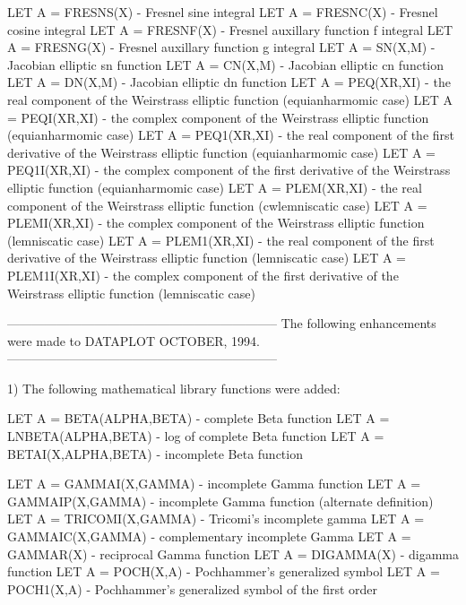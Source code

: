 {       LET A = FRESNS(X)     - Fresnel sine integral
       LET A = FRESNC(X)     - Fresnel cosine integral
       LET A = FRESNF(X)     - Fresnel auxillary function f integral
       LET A = FRESNG(X)     - Fresnel auxillary function g integral
       LET A = SN(X,M)       - Jacobian elliptic sn function
       LET A = CN(X,M)       - Jacobian elliptic cn function
       LET A = DN(X,M)       - Jacobian elliptic dn function
       LET A = PEQ(XR,XI)    - the real component of the Weirstrass
                               elliptic function (equianharmomic case)
       LET A = PEQI(XR,XI)   - the complex component of the Weirstrass
                               elliptic function (equianharmomic case)
       LET A = PEQ1(XR,XI)   - the real component of the first 
                               derivative of the Weirstrass elliptic
                               function (equianharmomic case)
       LET A = PEQ1I(XR,XI)  - the complex component of the first 
                               derivative of the Weirstrass elliptic
                               function (equianharmomic case)
       LET A = PLEM(XR,XI)   - the real component of the Weirstrass
                               elliptic function (cwlemniscatic case)
       LET A = PLEMI(XR,XI)  - the complex component of the Weirstrass
                               elliptic function (lemniscatic case)
       LET A = PLEM1(XR,XI)  - the real component of the first 
                               derivative of the Weirstrass elliptic
                               function (lemniscatic case)
       LET A = PLEM1I(XR,XI) - the complex component of the first 
                               derivative of the Weirstrass elliptic
                               function (lemniscatic case)

-----------------------------------------------------------------
The following enhancements were made to DATAPLOT OCTOBER, 1994.
-----------------------------------------------------------------

 1) The following mathematical library functions were added:

       LET A = BETA(ALPHA,BETA)    - complete Beta function
       LET A = LNBETA(ALPHA,BETA)  - log of complete Beta function
       LET A = BETAI(X,ALPHA,BETA) - incomplete Beta function

       LET A = GAMMAI(X,GAMMA)     - incomplete Gamma function
       LET A = GAMMAIP(X,GAMMA)    - incomplete Gamma function 
                                     (alternate definition)
       LET A = TRICOMI(X,GAMMA)    - Tricomi's incomplete gamma
       LET A = GAMMAIC(X,GAMMA)    - complementary incomplete Gamma
       LET A = GAMMAR(X)           - reciprocal Gamma function
       LET A = DIGAMMA(X)          - digamma function
       LET A = POCH(X,A)           - Pochhammer's generalized symbol
       LET A = POCH1(X,A)          - Pochhammer's generalized symbol of
                                     the first order

}
